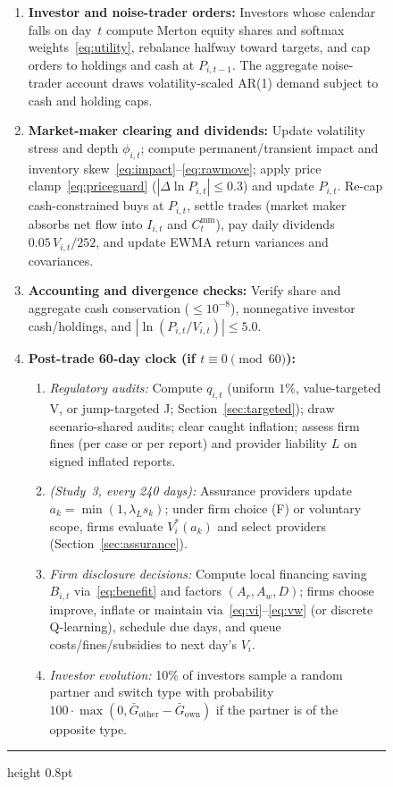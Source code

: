 \documentclass[11pt]{article}
\begin{document}
\begin{figure}[t]
\begin{minipage}{0.96\textwidth}
\begin{enumerate}[leftmargin=1.8em, itemsep=2pt, topsep=0pt]
\begin{enumerate}[label=(\alph*), leftmargin=1.5em, itemsep=1pt, topsep=1pt]
  \end{enumerate}
\item \textbf{Investor and noise-trader orders:} Investors whose calendar falls on day~$t$ compute Merton equity shares and softmax weights~\eqref{eq:utility}, rebalance halfway toward targets, and cap orders to holdings and cash at $P_{i,t-1}$. The aggregate noise-trader account draws volatility-scaled AR(1) demand subject to cash and holding caps.
\item \textbf{Market-maker clearing and dividends:} Update volatility stress and depth $\phi_{i,t}$; compute permanent/transient impact and inventory skew~\eqref{eq:impact}--\eqref{eq:rawmove}; apply price clamp~\eqref{eq:priceguard} ($|\Delta\ln P_{i,t}| \le 0.3$) and update $P_{i,t}$. Re-cap cash-constrained buys at $P_{i,t}$, settle trades (market maker absorbs net flow into $I_{i,t}$ and $C^{\text{mm}}_t$), pay daily dividends $0.05\,V_{i,t}/252$, and update EWMA return variances and covariances.
\item \textbf{Accounting and divergence checks:} Verify share and aggregate cash conservation ($\le 10^{-8}$), nonnegative investor cash/holdings, and $|\ln(P_{i,t}/V_{i,t})| \le 5.0$.
\item \textbf{Post-trade 60-day clock (if $t \equiv 0 \pmod{60}$):}
  \begin{enumerate}[label=(\alph*), leftmargin=1.5em, itemsep=1pt, topsep=1pt]
  \item \emph{Regulatory audits:} Compute $q_{i,t}$ (uniform $1\%$, value-targeted V, or jump-targeted J; Section~\ref{sec:targeted}); draw scenario-shared audits; clear caught inflation; assess firm fines (per case or per report) and provider liability $L$ on signed inflated reports.
  \item \emph{(Study~3, every 240 days):} Assurance providers update $a_k = \min(1, \lambda_L s_k)$; under firm choice (F) or voluntary scope, firms evaluate $V^*_i(a_k)$ and select providers (Section~\ref{sec:assurance}).
  \item \emph{Firm disclosure decisions:} Compute local financing saving $B_{i,t}$ via~\eqref{eq:benefit} and factors $(A_r, A_w, D)$; firms choose improve, inflate or maintain via~\eqref{eq:vi}--\eqref{eq:vw} (or discrete Q-learning), schedule due days, and queue costs/fines/subsidies to next day's $V_i$.
  \item \emph{Investor evolution:} 10\% of investors sample a random partner and switch type with probability $100\cdot\max(0, \bar G_{\text{other}} - \bar G_{\text{own}})$ if the partner is of the opposite type.
  \end{enumerate}
\end{enumerate}
\vspace{3pt}
\hrule height 0.8pt
\end{minipage}
\end{figure}
\end{document}

